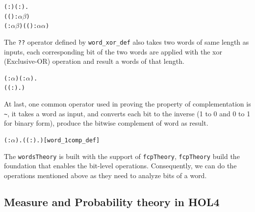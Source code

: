 \documentclass{article}
\begin{document}
\begin{alltt}
\HOLTokenTurnstile{} \HOLSymConst{\HOLTokenForall{}}( :) ( :).
     (( \HOLSymConst{\HOLTokenExtract{}} ) :\ensuremath{\alpha}  \HOLTokenMap{} \ensuremath{\beta} ) \HOLSymConst{=}
     ( :\ensuremath{\alpha}  \HOLTokenMap{} \ensuremath{\beta} ) \HOLSymConst{\HOLTokenCompose} (( \HOLSymConst{--} ) :\ensuremath{\alpha}  \HOLTokenMap{} \ensuremath{\alpha} )
\end{alltt}

The \verb|??| operator defined by \verb|word_xor_def| also takes two words of same length as inputs,
each corresponding bit of the two words are applied with the xor (Exclusive-OR) operation
and result a words of that length.

\begin{alltt}
\HOLTokenTurnstile{} \HOLSymConst{\HOLTokenForall{}}( :\ensuremath{\alpha} ) ( :\ensuremath{\alpha} ).
      \HOLSymConst{\HOLTokenEor{}}  \HOLSymConst{=} (( :).    \HOLSymConst{\HOLTokenNotEquiv{}}   )
\end{alltt}

At last, one common operator used in proving the property of complementation is \verb|~|, it takes a word as input, and converts
each bit to the inverse (1 to 0 and 0 to 1 for binary form), produce the bitwise complement of word as result.

\begin{alltt}
\HOLTokenTurnstile{} \HOLSymConst{\HOLTokenForall{}}( :\ensuremath{\alpha} ). \HOLSymConst{\HOLTokenNeg{}} \HOLSymConst{=} (( :). \HOLSymConst{\HOLTokenNeg{}}  )\hfill{[word_1comp_def]}
\end{alltt}

The \verb|wordsTheory| is built with the support of \verb|fcpTheory|, \verb|fcpTheory| build the foundation that enables the bit-level operations.
Consequently, we can do the operations mentioned above as they need to analyze bits of a word.

\subsection{Measure and Probability theory in HOL4}
\end{document}
